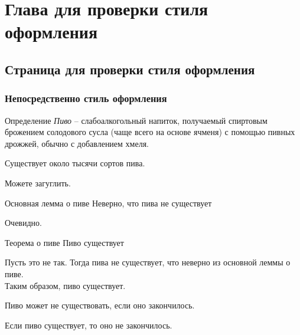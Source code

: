 \setcounter{chapter}{-1}
\chapter{Глава для проверки стиля оформления}
\section{Страница для проверки стиля оформления}
\subsection{Непосредственно стиль оформления}
\begin{definition}{Определение}
    \textit{Пиво} -- слабоалкогольный напиток, получаемый спиртовым брожением солодового сусла (чаще всего на основе ячменя) с помощью пивных дрожжей, обычно с добавлением хмеля.
\end{definition}

\begin{statement}
    Существует около тысячи сортов пива.
\end{statement}
\begin{sproof}
    Можете загуглить.
\end{sproof}

\begin{lemma} {Основная лемма о пиве}
    Неверно, что пива не существует
\end{lemma}
\begin{lproof}
    Очевидно.
\end{lproof}

\begin{theorem} {Теорема о пиве}
    Пиво существует
\end{theorem}
\begin{tproof}
    Пусть это не так. Тогда пива не существует, что неверно из основной леммы о пиве. \\
    Таким образом, пиво существует.
\end{tproof}

\begin{note}{}
    Пиво может не существовать, если оно закончилось.
\end{note}

\begin{conseq}
    Если пиво существует, то оно не закончилось.
\end{conseq}